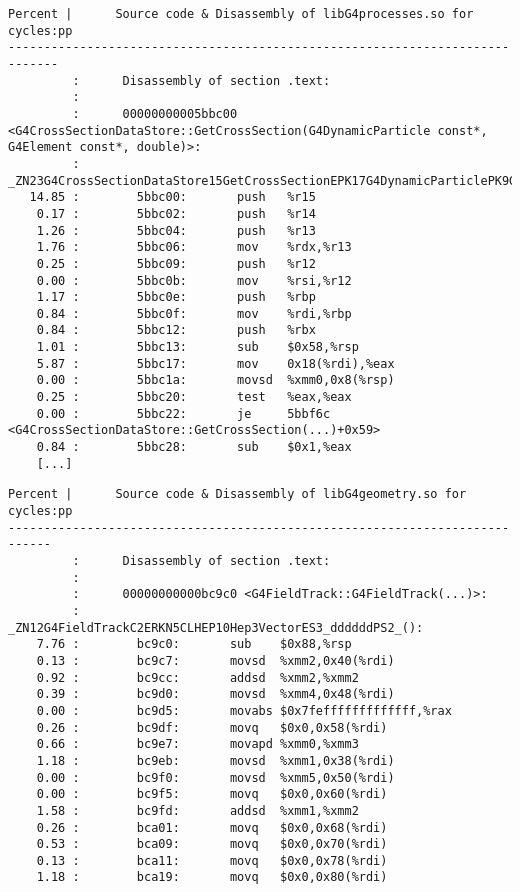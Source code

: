 \documentclass[a4paper]{jpconf}
\begin{document}
\begin{appendices}
\begin{minipage}{\linewidth}
\begin{lstlisting}[language={[x64]Assembler}, basicstyle=\ttfamily\tiny,
caption=G4CrossSectionDataStore::GetCrossSection cycles annotation]
Percent |      Source code & Disassembly of libG4processes.so for  cycles:pp
-----------------------------------------------------------------------------
         :      Disassembly of section .text:
         :
         :      00000000005bbc00 <G4CrossSectionDataStore::GetCrossSection(G4DynamicParticle const*, G4Element const*, double)>:
         :      _ZN23G4CrossSectionDataStore15GetCrossSectionEPK17G4DynamicParticlePK9G4Elementd():
   14.85 :        5bbc00:       push   %r15
    0.17 :        5bbc02:       push   %r14
    1.26 :        5bbc04:       push   %r13
    1.76 :        5bbc06:       mov    %rdx,%r13
    0.25 :        5bbc09:       push   %r12
    0.00 :        5bbc0b:       mov    %rsi,%r12
    1.17 :        5bbc0e:       push   %rbp
    0.84 :        5bbc0f:       mov    %rdi,%rbp
    0.84 :        5bbc12:       push   %rbx
    1.01 :        5bbc13:       sub    $0x58,%rsp
    5.87 :        5bbc17:       mov    0x18(%rdi),%eax
    0.00 :        5bbc1a:       movsd  %xmm0,0x8(%rsp)
    0.25 :        5bbc20:       test   %eax,%eax
    0.00 :        5bbc22:       je     5bbf6c <G4CrossSectionDataStore::GetCrossSection(...)+0x59>
    0.84 :        5bbc28:       sub    $0x1,%eax
    [...]
\end{lstlisting}
\end{minipage}

\begin{minipage}{\linewidth}
\begin{lstlisting}[language={[x64]Assembler}, basicstyle=\ttfamily\tiny,
caption=G4FieldTrack::G4FieldTrack cycles annotation]
 Percent |      Source code & Disassembly of libG4geometry.so for  cycles:pp
----------------------------------------------------------------------------
         :      Disassembly of section .text:
         :
         :      00000000000bc9c0 <G4FieldTrack::G4FieldTrack(...)>:
         :      _ZN12G4FieldTrackC2ERKN5CLHEP10Hep3VectorES3_ddddddPS2_():
    7.76 :        bc9c0:       sub    $0x88,%rsp
    0.13 :        bc9c7:       movsd  %xmm2,0x40(%rdi)
    0.92 :        bc9cc:       addsd  %xmm2,%xmm2
    0.39 :        bc9d0:       movsd  %xmm4,0x48(%rdi)
    0.00 :        bc9d5:       movabs $0x7fefffffffffffff,%rax
    0.26 :        bc9df:       movq   $0x0,0x58(%rdi)
    0.66 :        bc9e7:       movapd %xmm0,%xmm3
    1.18 :        bc9eb:       movsd  %xmm1,0x38(%rdi)
    0.00 :        bc9f0:       movsd  %xmm5,0x50(%rdi)
    0.00 :        bc9f5:       movq   $0x0,0x60(%rdi)
    1.58 :        bc9fd:       addsd  %xmm1,%xmm2
    0.26 :        bca01:       movq   $0x0,0x68(%rdi)
    0.53 :        bca09:       movq   $0x0,0x70(%rdi)
    0.13 :        bca11:       movq   $0x0,0x78(%rdi)
    1.18 :        bca19:       movq   $0x0,0x80(%rdi)
\end{lstlisting}
\end{minipage}


\end{appendices}
\end{document}
